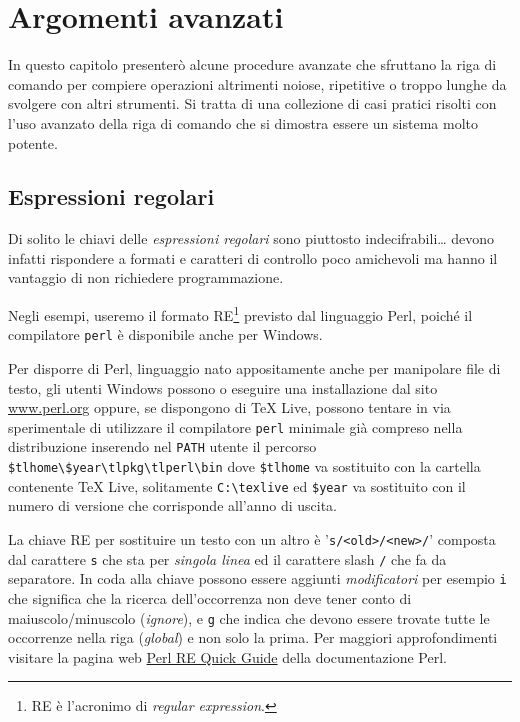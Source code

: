 
\chapter{Argomenti avanzati}
\label{chapAvanz}

In questo capitolo presenterò alcune procedure avanzate che sfruttano la riga di comando per compiere operazioni altrimenti noiose, ripetitive o troppo lunghe da svolgere con altri strumenti. Si tratta di una collezione di casi pratici risolti con l'uso avanzato della riga di comando che si dimostra essere un sistema molto potente.

\section{Espressioni regolari}

Di solito le chiavi delle \emph{espressioni regolari} sono piuttosto indecifrabili\dots{} devono infatti rispondere a formati e caratteri di controllo poco amichevoli ma hanno il vantaggio di non richiedere programmazione.

Negli esempi, useremo il formato RE\footnote{RE è l'acronimo di \emph{regular expression}.} previsto dal linguaggio Perl, poiché il compilatore \texttt{perl} è disponibile anche per Windows.

Per disporre di Perl, linguaggio nato appositamente anche per manipolare file di testo, gli utenti Windows possono o eseguire una installazione dal sito \url{www.perl.org} oppure, se dispongono di \TeX{} Live, possono tentare in via sperimentale di utilizzare il compilatore \texttt{perl} minimale già compreso nella distribuzione inserendo nel \texttt{PATH} utente il percorso \texttt{\$tlhome\textbackslash\$year\textbackslash tlpkg\textbackslash tlperl\textbackslash bin} dove \texttt{\$tlhome} va sostituito con la cartella contenente \TeX{} Live, solitamente \texttt{C:\textbackslash texlive} ed \texttt{\$year} va sostituito con il numero di versione che corrisponde all'anno di uscita.

La chiave RE per sostituire un testo con un altro è '\verb=s/<old>/<new>/=' composta dal carattere \texttt{s} che sta per \emph{singola linea} ed il carattere slash \texttt{/} che fa da separatore. In coda alla chiave possono essere aggiunti \emph{modificatori} per esempio \texttt{i} che significa che la ricerca dell'occorrenza non deve tener conto di maiuscolo/minuscolo (\emph{ignore}), e \texttt{g} che indica che devono essere trovate tutte le occorrenze nella riga (\emph{global}) e non solo la prima. Per maggiori approfondimenti visitare la pagina web \href{http://perldoc.perl.org/perlrequick.html}{Perl RE Quick Guide} della documentazione Perl.


